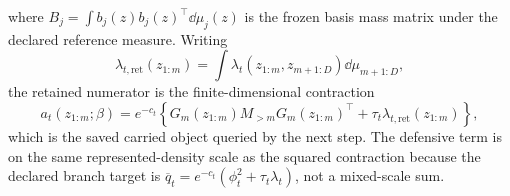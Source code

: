 where \(B_j=\int b_j(z)b_j(z)^\top\dd\mu_j(z)\) is the frozen basis
mass matrix under the declared reference measure.  Writing
\begin{equation}
  \lambda_{t,\mathrm{ret}}(z_{1:m})
  =\int\lambda_t(z_{1:m},z_{m+1:D})\dd\mu_{m+1:D},
  \label{eq:bf-hd-squared-tt-defensive-retained}
\end{equation}
the retained numerator is the finite-dimensional contraction
\begin{equation}
  a_t(z_{1:m};\beta)
  =
  e^{-c_t}
  \left\{
    G_m(z_{1:m})M_{>m}G_m(z_{1:m})^\top
    +\tau_t\lambda_{t,\mathrm{ret}}(z_{1:m})
  \right\},
  \label{eq:bf-hd-squared-tt-retained-numerator-contraction}
\end{equation}
which is the saved carried object queried by the next step.  The defensive term
is on the same represented-density scale as the squared contraction because the
declared branch target is
\(\overline q_t=e^{-c_t}(\phi_t^2+\tau_t\lambda_t)\),
not a mixed-scale sum.

